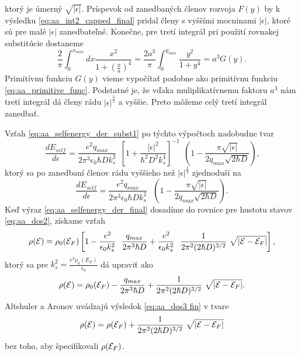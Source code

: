 ktorý je úmerný $\sqrt{|\epsilon|}$. Príspevok od zanedbaných členov rozvoja $F(y)$ by k výsledku \eqref{eq:aa_int2_capped_final} pridal členy s vyššími mocninami $|\epsilon|$, ktoré sú pre malé $|\epsilon|$ zanedbateľné.
Konečne,  pre tretí integrál pri použití rovnakej substitúcie dostaneme
\begin{equation}
 \label{eq:aa_int3}
 \frac{2}{\pi}\int_0^{x_{max}}dx\frac{x^2}{1+(\frac{x}{a})^4} =   \frac{2a^3}{\pi}\int_0^{y_{max}}\frac{y^2}{1+y^4}=a^3G(y) \text{.}
\end{equation}
Primitívnu funkciu $G(y)$ vieme vypočítať podobne ako primitívnu funkciu \eqref{eq:aa_primitive_func}.
Podstatné je, že vďaka muliplikatívnemu faktoru $a^3$ nám tretí integrál dá členy rádu $|\epsilon|^{\frac{3}{2}}$ a vyššie. Preto
môžeme celý tretí integrál zanedbať.

Vzťah \eqref{eq:aa_selfenergy_der_subst1} po týchto výpočtoch nadobudne tvar
\begin{equation}
\frac{dE_{self}}{d\epsilon}=
\frac{e^2q_{max}}{2\pi^3 \epsilon_0 \hbar D k_s^{2}}  \ \   \left[1+\frac{|\epsilon|^2}{\hbar^2D^2k_s^4}\right]^{-1} \ \
\left(1- \frac{\pi\sqrt{|\epsilon|}}{2q_{max}\sqrt{2\hbar D }}\right)\text{,}
\end{equation}
ktorý sa po zanedbaní  členov rádu vyššieho  než $|\epsilon|^{\frac{1}{2}}$ zjednoduší na
\begin{equation}
\label{eq:aa_selfenergy_der_final}
\frac{dE_{self}}{d\epsilon}=\frac{e^2q_{max}}{2\pi^3 \epsilon_0 \hbar D k_s^{2}} \ \ \
\left(1- \frac{\pi\sqrt{|\epsilon|}}{2q_{max}\sqrt{2\hbar D}}\right)        \text{.}
\end{equation}
Keď výraz  \eqref{eq:aa_selfenergy_der_final} dosadíme do rovnice pre hustotu stavov \eqref{eq:aa_dos2}, získame vzťah
\begin{equation}
 \label{eq:aa_dos3}
 \rho(\E)=\rho_0(\E_F)\left[1-\frac{e^{2}}{\epsilon_0 k_s^{2}}\ \  \frac{q_{max}}{2\pi^3 \hbar D}
 +  \frac{e^{2}}{\epsilon_0 k_s^{2}} \ \ \frac{1}{2\pi^2 (2\hbar D)^{3/2}}  \ \sqrt{|\E-\E_F|}  \right]\text{,}
\end{equation}
ktorý sa pre $k_s^2=\frac{e^2 \rho_0(E_F)}{\epsilon_0}$ dá upraviť ako
\begin{equation}
 \label{eq:aa_dos3 fin}
 \rho(\E)=\rho_0(\E_F) - \frac{q_{max}}{2\pi^3 \hbar D}
 +    \frac{1}{2\pi^2 (2\hbar D)^{3/2}}  \ \sqrt{|\E-\E_F|}  \text{.}
\end{equation}
Altshuler a Aronov uvádzajú výsledok \eqref{eq:aa_dos3 fin} v tvare
\begin{equation}
 \label{eq:aa_dos_final}
 \rho(\E)=\rho(\E_F)+ \frac{1}{2\pi^2 (2\hbar D)^{3/2}}  \ \sqrt{|\E-\E_F|}\text{}
\end{equation}
bez toho, aby špecifikovali $\rho(\mathcal{E}_F)$.



